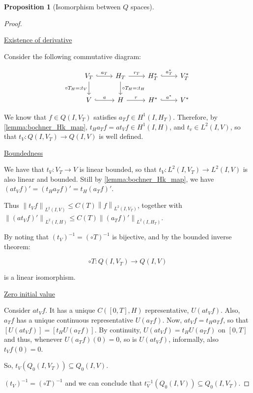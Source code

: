 \documentclass[english,a4paper,9pt,oneside]{scrbook}	%
\theoremstyle{break}
\newtheorem{prop}[equation]{Proposition}
\newenvironment{mproof}[1][\proofname]{%
  \begin{proof}[#1]$ $\par\nobreak\ignorespaces
}{%
  \end{proof}
}
\renewcommand*{\proofname}{Proof}
\theoremstyle{remark}
\newcommand{\norm}[1]{\left\lVert#1\right\rVert}
\begin{document}
\begin{appendices}
\begin{prop}[Isomorphism between $Q$ spaces]
\end{prop}

\begin{mproof}

\underline{Existence of derivative}

Consider the following commutative diagram:

\[\begin{tikzcd}
	{V_T} & {H_T} & {H_T^*} & {V^*_T} \\
	V & H & {H^*} & {V^*}
	\arrow["{a_T}", hook, from=1-1, to=1-2]
	\arrow["{r_T}", from=1-2, to=1-3]
	\arrow["{a_T^*}", hook, from=1-3, to=1-4]
	\arrow["r", from=2-2, to=2-3]
	\arrow["a^*", hook, from=2-3, to=2-4]
	\arrow["a", hook, from=2-1, to=2-2]
	\arrow["{\circ T_H=:t_V}"', from=1-1, to=2-1]
	\arrow["{\circ T_H=:t_H}", from=1-2, to=2-2]
\end{tikzcd}\]

We know that $f\in Q(I,V_T)$ satisfies $a_Tf \in H^1(I,H_T)$. Therefore, by \cref{lemma:bochner_Hk_map}, $t_H a_T f =a t_V f \in H^1(I,H)$, and $t_v  \in L^2(I,V)$, so that $t_V : Q(I,V_T)\rightarrow Q(I,V)$ is well defined.

\underline{Boundedness}

We have that $t_V: V_T \rightarrow V$ is linear bounded, so that $t_V: L^2(I,V_T)\rightarrow L^2(I,V)$ is also linear and bounded. Still by \cref{lemma:bochner_Hk_map}, we have $(a t_V f )' = (t_H a_T f)' = t_H(a_T f)'$.

Thus $\norm{t_V f}_{L^2(I, V)}\leq C(T) \norm{f}_{L^2(I, V_T)}$, together with $\norm{(a t_V f )'}_{L^2(I, H)}\leq C(T) \norm{(a_T f)'}_{L^2(I, H_T)}$.

By noting that $(t_V)^{-1} = (\circ T)^{-1} $ is bijective, and by the bounded inverse theorem:

$$\circ T : Q(I,V_T)\rightarrow Q(I,V)$$

is a linear isomorphism.

\underline{Zero initial value}

Consider $at_V f$. It has a unique $C([0,T],H)$ representative, $U(at_V f)$. Also, $a_T f$ has a unique continuous representative $U(a_T f)$. Now, $at_V f = t_H a_T f$, so that $[U(at_V f)] = [t_H U(a_T f)]$. By continuity, $U(at_V f) = t_H U(a_T f)$ on $[0,T]$ and thus, whenever $U(a_T f)(0)=0$, so is $U(at_V f)$, informally, also $t_Vf (0) =0$. 

So, $t_V(Q_0(I,V_T))\subseteq Q_0(I,V)$.

$(t_V)^{-1} = (\circ T)^{-1}$ and we can conclude that  $t_V^{-1}(Q_0(I,V))\subseteq Q_0(I,V_T)$.


\end{mproof}
\end{appendices}
\end{document}
